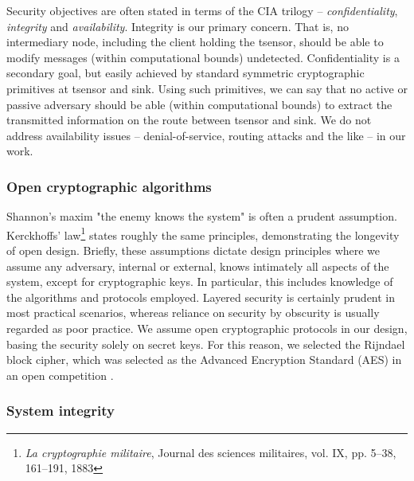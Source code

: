 Security objectives are often stated in terms of the CIA trilogy -- \textit{confidentiality}, \textit{integrity} and \textit{availability}. 
%
Integrity is our primary concern. That is, no intermediary node, including the client holding the tsensor, should be able to modify messages (within computational bounds) undetected. Confidentiality is a secondary goal, but easily achieved by standard symmetric cryptographic primitives at tsensor and sink. Using such primitives, we can say that no active or passive adversary should be able (within computational bounds) to extract the transmitted information on the route between tsensor and sink.
%
We do not address availability issues -- denial-of-service, routing attacks and the like -- in our work.

\subsubsection{Open cryptographic algorithms}

Shannon's maxim "the enemy knows the system" is often a prudent assumption. Kerckhoffs' law\footnote{\textit{La cryptographie militaire}, Journal des sciences militaires, vol. IX, pp. 5--38, 161–191, 1883} states roughly the same principles, demonstrating the longevity of open design. Briefly, these assumptions dictate design principles where we assume any adversary, internal or external, knows intimately all aspects of the system, except for cryptographic keys. In particular, this includes knowledge of the algorithms and protocols employed. Layered security is certainly prudent in most practical scenarios, whereas reliance on security by obscurity is usually regarded as poor practice. We assume open cryptographic protocols in our design, basing the security solely on secret keys. For this reason, we selected the Rijndael block cipher, which was selected as the Advanced Encryption Standard (AES) in an open competition \cite{}.

\subsubsection{System integrity}

